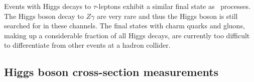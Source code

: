 Events with Higgs decays to $\tau$-leptons exhibit a similar final state as \HWW\ processes.
The Higgs boson decay to $Z\gamma$ are very rare and thus the Higgs boson is still searched for in these channels. 
The final states with charm quarks and gluons, making up a considerable fraction of all Higgs decays, are currently too difficult to differentiate from other events at a hadron collider.








\subsection{Higgs boson cross-section measurements}

